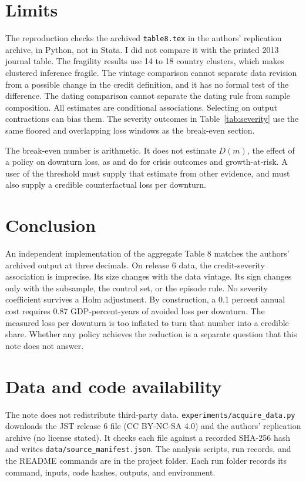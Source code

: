 \documentclass[11pt]{article}
\begin{document}
\section{Limits}
The reproduction checks the archived \texttt{table8.tex} in the authors' replication archive,
in Python, not in Stata. I did not compare it with the printed 2013 journal table. The
fragility results use 14 to 18 country clusters, which makes clustered inference fragile.
The vintage comparison cannot separate data revision from a possible change in the credit
definition, and it has no formal test of the difference. The dating comparison cannot
separate the dating rule from sample composition. All estimates are conditional
associations. Selecting on output contractions can bias them. The severity outcomes in
Table~\ref{tab:severity} use the same floored and overlapping loss windows as the
break-even section.

The break-even number is arithmetic. It does not estimate $D(m)$, the effect of a policy on
downturn loss, as \citet{svensson2017} and \citet{bgnn2020} do for crisis outcomes and
growth-at-risk. A user of the threshold must supply that estimate from other evidence, and
must also supply a credible counterfactual loss per downturn.

\section{Conclusion}
An independent implementation of the aggregate \citet{jst2013} Table 8 matches the authors'
archived output at three decimals. On release 6 data, the credit-severity association is
imprecise. Its size changes with the data vintage. Its sign changes only with the
subsample, the control set, or the episode rule. No severity coefficient survives a
Holm adjustment. By construction, a 0.1 percent annual cost requires 0.87 GDP-percent-years
of avoided loss per downturn. The measured loss per downturn is too inflated to turn that
number into a credible share. Whether any policy achieves the reduction is a separate
question that this note does not answer.

\section*{Data and code availability}
The note does not redistribute third-party data. \texttt{experiments/acquire\_data.py}
downloads the JST release 6 file (CC BY-NC-SA 4.0) and the authors' replication archive
(no license stated). It checks each file against a recorded SHA-256 hash and writes
\texttt{data/source\_manifest.json}. The analysis scripts, run records, and the README
commands are in the project folder. Each run folder records its command, inputs, code
hashes, outputs, and environment.
\end{document}
